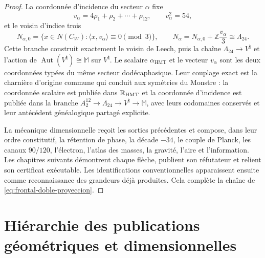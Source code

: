 \begin{proof}
La coordonnée d'incidence du secteur \(\alpha\) fixe
\[
v_\alpha=4\rho_1+\rho_2+\cdots+\rho_{12},
\qquad v_\alpha^2=54,
\]
et le voisin d'indice trois
\[
N_{\alpha,0}
=\{x\in N(C_W):\langle x,v_\alpha\rangle\equiv0\pmod3\},
\qquad
N_\alpha=N_{\alpha,0}+\mathbb Z\frac{v_\alpha}{3}
\cong\Lambda_{24}.
\]
Cette branche construit exactement le voisin de Leech, puis la chaîne
\(\Lambda_{24}\to V^\natural\) et l'action de
\(\operatorname{Aut}(V^\natural)\cong\mathbb M\) sur \(V^\natural\). Le
scalaire \(\alpha_{\mathrm{HMT}}\) et le vecteur \(v_\alpha\) sont les deux
coordonnées typées du même secteur dodécaphasique. Leur couplage exact est
la charnière d'origine commune qui conduit aux symétries du Monstre : la
coordonnée scalaire est publiée dans \(\mathbb R_{\rm HMT}\) et la coordonnée
d'incidence est publiée dans la branche
\(A_2^{12}\to\Lambda_{24}\to V^\natural\to\mathbb M\), avec leurs codomaines
conservés et leur antécédent généalogique partagé explicite.

La mécanique dimensionnelle reçoit les sorties précédentes et compose, dans leur ordre
constitutif, la rétention de phase, la décade \(-34\), le couple de Planck,
les canaux \(90/120\), l'électron, l'atlas des masses, la gravité, l'aire
et l'information. Les chapitres suivants démontrent chaque flèche, publient
son réfutateur et relient son certificat exécutable. Les identifications
conventionnelles apparaissent ensuite comme reconnaissance des grandeurs déjà
produites. Cela complète la chaîne de
\eqref{eq:frontal-doble-proyeccion}.
\end{proof}

\section*{Hiérarchie des publications géométriques et dimensionnelles}

